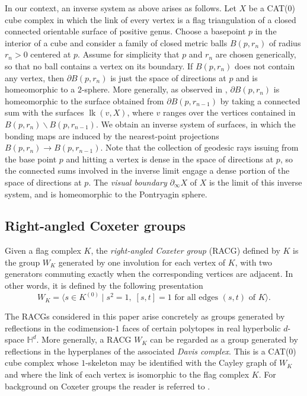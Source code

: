 \documentclass{amsart}
\theoremstyle{plain}
\theoremstyle{definition}
\theoremstyle{remark}
\numberwithin{equation}{section}
\newcommand{\hh}{\mathbb H}
\newcommand{\lk}[2]{\operatorname{lk}(#1,#2)} %
\renewcommand{\setminus}{\smallsetminus}
\begin{document}
In our context, an inverse system as above arises as follows.
Let $X$ be a CAT(0) cube complex in which the link of every vertex is a flag triangulation of a closed connected  orientable surface of positive genus.
Choose a basepoint $p$ in the interior of a cube and consider a family of closed metric balls $B(p,r_n)$ of radius $r_n>0$ centered at $p$. 
Assume for simplicity that $p$ and $r_n$ are chosen generically, so that no ball contains a vertex on its boundary. 
If $B(p,r_n)$ does not contain any vertex, then $\partial B(p,r_n)$ is just the space of directions at $p$ and is homeomorphic to a $2$-sphere. 
More generally, as observed in \cite[\S 3.d]{DJ91},  $\partial B(p,r_{n})$ is homeomorphic to the surface obtained from $\partial B(p,r_{n-1})$ by taking a connected sum with the surfaces $\lk{v}{X}$, where $v$ ranges over the  vertices contained in $B(p,r_{n})\setminus B(p,r_{n-1})$. 
We obtain an inverse system of surfaces, in which the bonding maps are induced by the nearest-point projections $B(p,r_{n})\to B(p,r_{n-1})$.
Note that the collection of geodesic rays issuing from the base point $p$ and hitting a vertex is dense in the space of directions at $p$, so the connected sums involved in the inverse limit engage a dense portion of the space of directions at $p$.
The \textit{visual boundary} $\partial_\infty X$ of $X$ is the limit of this inverse system, and is homeomorphic to the Pontryagin sphere.





\subsection{Right-angled Coxeter groups}
Given a flag complex $K$, the \textit{right-angled Coxeter group} (RACG) defined by $K$ is the group $W_K$ generated by one involution for each vertex of $K$, with two generators commuting exactly when the corresponding vertices are adjacent. In other words, it is defined by the following presentation
$$
W_K=\langle s\in K^{(0)} \mid s^2=1, \; [s,t]=1 \textrm{ for all edges } (s,t) \textrm{ of }  K \rangle.
$$

The RACGs considered in this paper arise  concretely as groups generated by reflections in the codimension-$1$ faces of certain polytopes in real hyperbolic $d$-space $\hh^d$. 
More generally, a RACG $W_K$ can be regarded as a group generated by reflections in the hyperplanes of the associated \textit{Davis complex}. 
This is a CAT(0) cube complex whose $1$-skeleton may be identified with the Cayley graph of $W_K$ and where the link of each vertex is isomorphic to the flag complex $K$.
For background on Coxeter groups the reader is referred to  \cite{DA08}.
\end{document}
